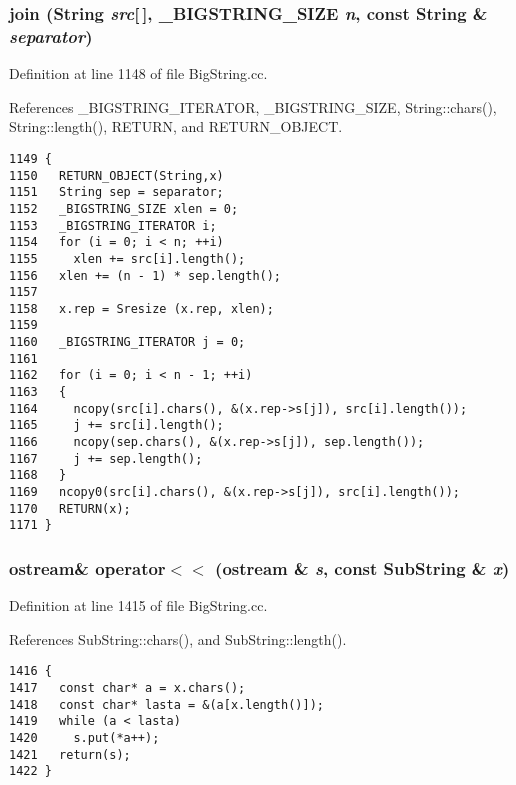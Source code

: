 \subsubsection{ join ({\bf String} {\em src}[$\,$], {\bf \_\-BIGSTRING\_\-SIZE} {\em n}, const {\bf String} \& {\em separator})}\label{BigString_8cc_a33}




Definition at line 1148 of file Big\-String.cc.

References \_\-BIGSTRING\_\-ITERATOR, \_\-BIGSTRING\_\-SIZE, String::chars(), String::length(), RETURN, and RETURN\_\-OBJECT.



\footnotesize\begin{verbatim}1149 {
1150   RETURN_OBJECT(String,x)
1151   String sep = separator;
1152   _BIGSTRING_SIZE xlen = 0;
1153   _BIGSTRING_ITERATOR i;
1154   for (i = 0; i < n; ++i)
1155     xlen += src[i].length();
1156   xlen += (n - 1) * sep.length();
1157 
1158   x.rep = Sresize (x.rep, xlen);
1159 
1160   _BIGSTRING_ITERATOR j = 0;
1161   
1162   for (i = 0; i < n - 1; ++i)
1163   {
1164     ncopy(src[i].chars(), &(x.rep->s[j]), src[i].length());
1165     j += src[i].length();
1166     ncopy(sep.chars(), &(x.rep->s[j]), sep.length());
1167     j += sep.length();
1168   }
1169   ncopy0(src[i].chars(), &(x.rep->s[j]), src[i].length());
1170   RETURN(x);
1171 }
\end{verbatim}\normalsize 
{}
\subsubsection{\setlength{\rightskip}{0pt plus 5cm}ostream\& operator$<$$<$ (ostream \& {\em s}, const {\bf Sub\-String} \& {\em x})}\label{BigString_8cc_a44}




Definition at line 1415 of file Big\-String.cc.

References Sub\-String::chars(), and Sub\-String::length().



\footnotesize\begin{verbatim}1416 { 
1417   const char* a = x.chars();
1418   const char* lasta = &(a[x.length()]);
1419   while (a < lasta)
1420     s.put(*a++);
1421   return(s);
1422 }
\end{verbatim}\normalsize 
{}
